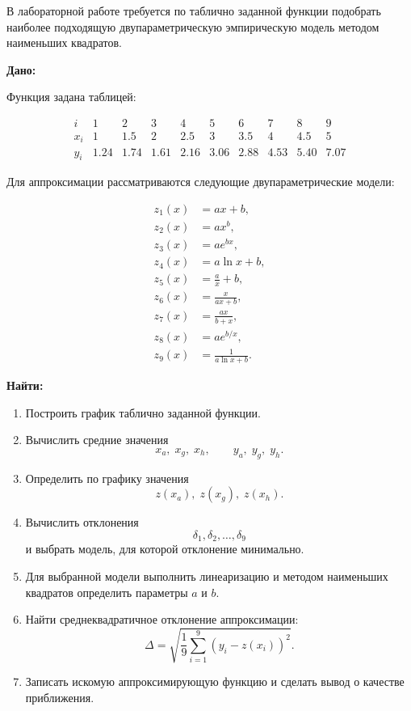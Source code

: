 В лабораторной работе требуется по таблично заданной функции подобрать
наиболее подходящую двупараметрическую эмпирическую модель методом
наименьших квадратов.

\textbf{Дано:}

Функция задана таблицей:

\[
\begin{array}{c|ccccccccc}
i      & 1 & 2 & 3 & 4 & 5 & 6 & 7 & 8 & 9 \\ \hline
x_i    & 1 & 1.5 & 2 & 2.5 & 3 & 3.5 & 4 & 4.5 & 5 \\
y_i    & 1.24 & 1.74 & 1.61 & 2.16 & 3.06 & 2.88 & 4.53 & 5.40 & 7.07
\end{array}
\]

Для аппроксимации рассматриваются следующие двупараметрические модели:

\[
\begin{aligned}
z_1(x) &= ax+b, \\
z_2(x) &= ax^b, \\
z_3(x) &= ae^{bx}, \\
z_4(x) &= a\ln x+b, \\
z_5(x) &= \frac{a}{x}+b, \\
z_6(x) &= \frac{x}{ax+b}, \\
z_7(x) &= \frac{ax}{b+x}, \\
z_8(x) &= ae^{b/x}, \\
z_9(x) &= \frac{1}{a\ln x+b}.
\end{aligned}
\]

\textbf{Найти:}

\begin{enumerate}
    \item Построить график таблично заданной функции.
    \item Вычислить средние значения
    \[
    x_a,\; x_g,\; x_h,\qquad y_a,\; y_g,\; y_h.
    \]
    \item Определить по графику значения
    \[
    z(x_a),\; z(x_g),\; z(x_h).
    \]
    \item Вычислить отклонения
    \[
    \delta_1,\delta_2,\dots,\delta_9
    \]
    и выбрать модель, для которой отклонение минимально.
    \item Для выбранной модели выполнить линеаризацию и методом наименьших квадратов определить параметры $a$ и $b$.
    \item Найти среднеквадратичное отклонение аппроксимации:
    \[
    \Delta=\sqrt{\frac{1}{9}\sum_{i=1}^{9}\left(y_i-z(x_i)\right)^2}.
    \]
    \item Записать искомую аппроксимирующую функцию и сделать вывод о качестве приближения.
\end{enumerate}
